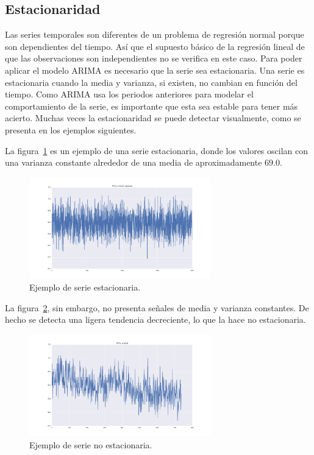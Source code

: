 \documentclass[11pt,spanish,listoffigures,listoftables]{tfgetsinf}
\begin{document}
    \subsection{Estacionaridad}
    Las series temporales son diferentes de un problema de regresión normal porque son dependientes del tiempo. Así que el supuesto básico de la regresión lineal de que las observaciones son independientes no se verifica en este caso. Para poder aplicar el modelo ARIMA es necesario que la serie sea estacionaria. Una serie es estacionaria cuando la media y varianza, si existen, no cambian en función del tiempo. Como ARIMA usa los periodos anteriores para modelar el comportamiento de la serie, es importante que esta sea estable para tener más acierto. Muchas veces la estacionaridad se puede detectar visualmente, como se presenta en los ejemplos siguientes.
    
    La figura~\ref{fig:stationary} es un ejemplo de una serie estacionaria, donde los valores oscilan con una varianza constante alrededor de una media de aproximadamente \(69.0\). 
    
    \begin{figure}[h]
        \centering
        \includegraphics[width=0.7\textwidth]{APVs_inverse_gaussian.png}
        \caption{Ejemplo de serie estacionaria.}
        \label{fig:stationary}
    \end{figure}

    La figura~\ref{fig:non_stationary}, sin embargo, no presenta señales de media y varianza constantes. De hecho se detecta una ligera tendencia decreciente, lo que la hace no estacionaria. 
    
    \begin{figure}[h]
        \centering
        \includegraphics[width=0.7\textwidth]{APVs_original.png}
        \caption{Ejemplo de serie no estacionaria.}
        \label{fig:non_stationary}
    \end{figure}
    
\end{document}
